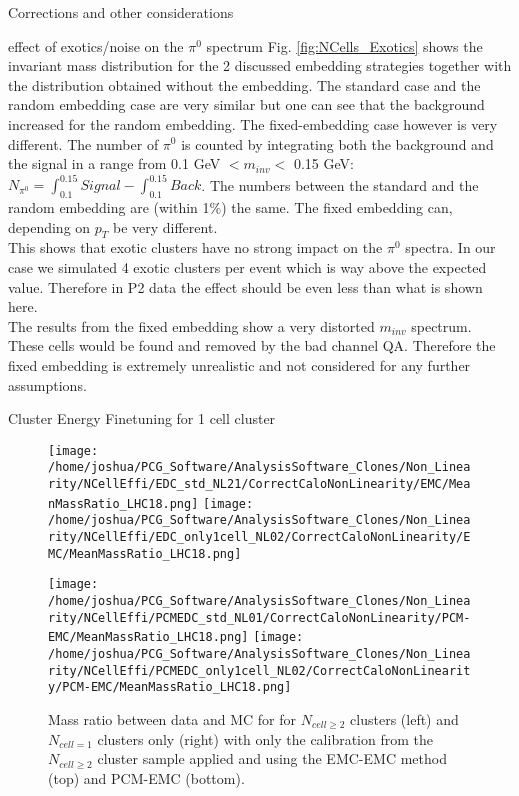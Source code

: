 \documentclass[ALICE]{ALICE_analysis_notes}
\begin{document}
\begin{section}{Corrections and other considerations}
\begin{subsection}{effect of exotics/noise on the $\pi^{0}$ spectrum}
Fig. \ref{fig:NCells_Exotics} shows the invariant mass distribution for the 2 discussed embedding strategies together with the distribution obtained without the embedding. The standard case and the random embedding case are very similar but one can see that the background increased for the random embedding. The fixed-embedding case however is very different. The number of $\pi^{0}$ is counted by integrating both the background and the signal in a range from 0.1 GeV $< m_{inv} <$ 0.15 GeV: $N_{\pi^{0}} = \int_{0.1}^{0.15} Signal -\int_{0.1}^{0.15} Back$. The numbers between the standard and the random embedding are (within 1\%) the same. The fixed embedding can, depending on $p_{T}$ be very different.\\
This shows that exotic clusters have no strong impact on the $\pi^{0}$ spectra. In our case we simulated 4 exotic clusters per event which is way above the expected value. Therefore in P2 data the effect should be even less than what is shown here.\\
The results from the fixed embedding show a very distorted $m_{inv}$ spectrum. These cells would be found and removed by the bad channel QA. Therefore the fixed embedding is extremely unrealistic and not considered for any further assumptions. 

\end{subsection}
\newpage
\begin{subsection}{Cluster Energy Finetuning for 1 cell cluster}
	\label{sec:nonlin}
\begin{figure}[ht!]
	\centering
	\texttt{[image: /home/joshua/PCG\_Software/AnalysisSoftware\_Clones/Non\_Linearity/NCellEffi/EDC\_std\_NL21/CorrectCaloNonLinearity/EMC/MeanMassRatio\_LHC18.png]}
	\texttt{[image: /home/joshua/PCG\_Software/AnalysisSoftware\_Clones/Non\_Linearity/NCellEffi/EDC\_only1cell\_NL02/CorrectCaloNonLinearity/EMC/MeanMassRatio\_LHC18.png]}
	
		
	\texttt{[image: /home/joshua/PCG\_Software/AnalysisSoftware\_Clones/Non\_Linearity/NCellEffi/PCMEDC\_std\_NL01/CorrectCaloNonLinearity/PCM-EMC/MeanMassRatio\_LHC18.png]}
	\texttt{[image: /home/joshua/PCG\_Software/AnalysisSoftware\_Clones/Non\_Linearity/NCellEffi/PCMEDC\_only1cell\_NL02/CorrectCaloNonLinearity/PCM-EMC/MeanMassRatio\_LHC18.png]}
	
	\caption{ Mass ratio between data and MC for for $N_{cell \geq 2}$ clusters (left) and $N_{cell = 1}$ clusters only (right) with only the calibration from the $N_{cell \geq 2}$ cluster sample applied and using the EMC-EMC method (top) and PCM-EMC (bottom).}
	\label{fig:NonLin}
\end{figure}



\end{subsection}
\end{section}
\end{document}
